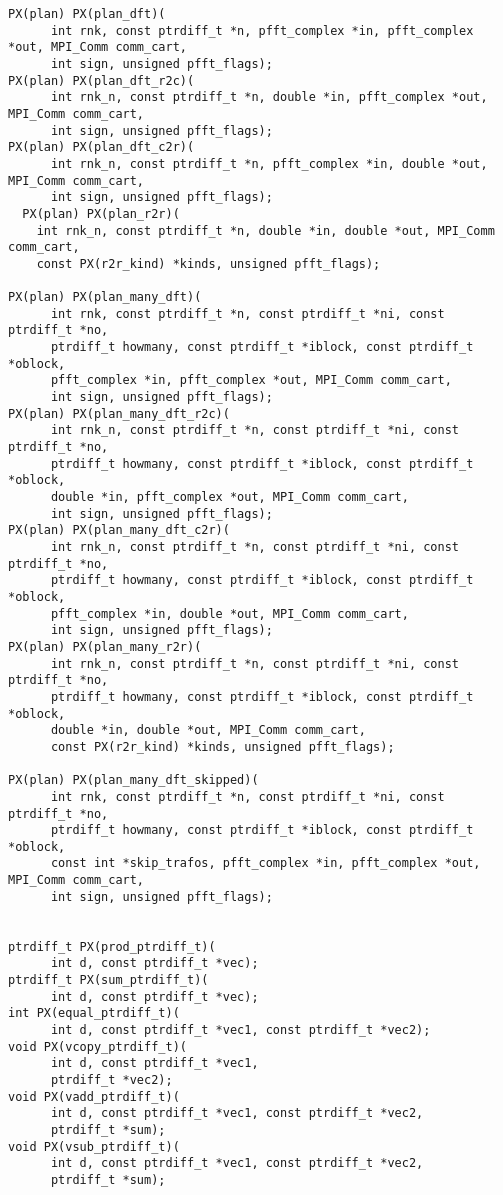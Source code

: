 \begin{lstlisting}
PX(plan) PX(plan_dft)(
      int rnk, const ptrdiff_t *n, pfft_complex *in, pfft_complex *out, MPI_Comm comm_cart,
      int sign, unsigned pfft_flags);
PX(plan) PX(plan_dft_r2c)(
      int rnk_n, const ptrdiff_t *n, double *in, pfft_complex *out, MPI_Comm comm_cart,
      int sign, unsigned pfft_flags);
PX(plan) PX(plan_dft_c2r)(
      int rnk_n, const ptrdiff_t *n, pfft_complex *in, double *out, MPI_Comm comm_cart,
      int sign, unsigned pfft_flags);
  PX(plan) PX(plan_r2r)(
    int rnk_n, const ptrdiff_t *n, double *in, double *out, MPI_Comm comm_cart,
    const PX(r2r_kind) *kinds, unsigned pfft_flags);

PX(plan) PX(plan_many_dft)(
      int rnk, const ptrdiff_t *n, const ptrdiff_t *ni, const ptrdiff_t *no,
      ptrdiff_t howmany, const ptrdiff_t *iblock, const ptrdiff_t *oblock,
      pfft_complex *in, pfft_complex *out, MPI_Comm comm_cart,
      int sign, unsigned pfft_flags);
PX(plan) PX(plan_many_dft_r2c)(
      int rnk_n, const ptrdiff_t *n, const ptrdiff_t *ni, const ptrdiff_t *no,
      ptrdiff_t howmany, const ptrdiff_t *iblock, const ptrdiff_t *oblock,
      double *in, pfft_complex *out, MPI_Comm comm_cart,
      int sign, unsigned pfft_flags);
PX(plan) PX(plan_many_dft_c2r)(
      int rnk_n, const ptrdiff_t *n, const ptrdiff_t *ni, const ptrdiff_t *no,
      ptrdiff_t howmany, const ptrdiff_t *iblock, const ptrdiff_t *oblock,
      pfft_complex *in, double *out, MPI_Comm comm_cart,
      int sign, unsigned pfft_flags);
PX(plan) PX(plan_many_r2r)(
      int rnk_n, const ptrdiff_t *n, const ptrdiff_t *ni, const ptrdiff_t *no,
      ptrdiff_t howmany, const ptrdiff_t *iblock, const ptrdiff_t *oblock,
      double *in, double *out, MPI_Comm comm_cart,
      const PX(r2r_kind) *kinds, unsigned pfft_flags);

PX(plan) PX(plan_many_dft_skipped)(
      int rnk, const ptrdiff_t *n, const ptrdiff_t *ni, const ptrdiff_t *no,
      ptrdiff_t howmany, const ptrdiff_t *iblock, const ptrdiff_t *oblock,
      const int *skip_trafos, pfft_complex *in, pfft_complex *out, MPI_Comm comm_cart,
      int sign, unsigned pfft_flags);


ptrdiff_t PX(prod_ptrdiff_t)(
      int d, const ptrdiff_t *vec);
ptrdiff_t PX(sum_ptrdiff_t)(
      int d, const ptrdiff_t *vec);
int PX(equal_ptrdiff_t)(
      int d, const ptrdiff_t *vec1, const ptrdiff_t *vec2);
void PX(vcopy_ptrdiff_t)(
      int d, const ptrdiff_t *vec1,
      ptrdiff_t *vec2);
void PX(vadd_ptrdiff_t)(
      int d, const ptrdiff_t *vec1, const ptrdiff_t *vec2,
      ptrdiff_t *sum);
void PX(vsub_ptrdiff_t)(
      int d, const ptrdiff_t *vec1, const ptrdiff_t *vec2,
      ptrdiff_t *sum);


\end{lstlisting}

